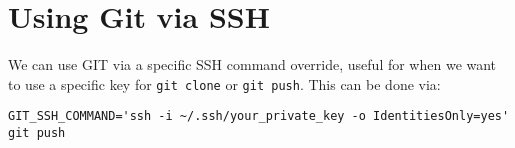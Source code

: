 \section{Using Git via SSH}
We can use GIT via a specific SSH command override, useful for when we want to use a specific key for \texttt{git clone} or \texttt{git push}. This can be done via:

\verb|GIT_SSH_COMMAND='ssh -i ~/.ssh/your_private_key -o IdentitiesOnly=yes' git push|